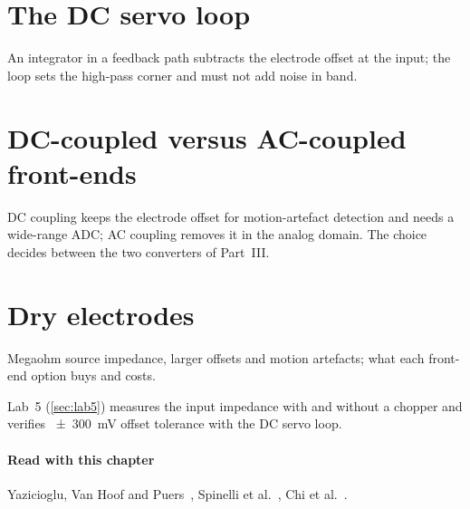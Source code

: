 \section{The DC servo loop}\label{sec:ch10-3}
An integrator in a feedback path subtracts the electrode offset at the input; the loop sets the high-pass corner and must not add noise in band.

\section{DC-coupled versus AC-coupled front-ends}\label{sec:ch10-4}
DC coupling keeps the electrode offset for motion-artefact detection and needs a wide-range ADC; AC coupling removes it in the analog domain. The choice decides between the two converters of Part~III.

\section{Dry electrodes}\label{sec:ch10-5}
Megaohm source impedance, larger offsets and motion artefacts; what each front-end option buys and costs.

\begin{tryit}
Lab~5 (\cref{sec:lab5}) measures the input impedance with and without a chopper and verifies \qty{\pm 300}{\milli\volt} offset tolerance with the DC servo loop.
\end{tryit}

\paragraph{Read with this chapter} Yazicioglu, Van Hoof and Puers~\cite{yazicioglubook}, Spinelli et al.~\cite{spinelli2003}, Chi et al.~\cite{chi2010}.
